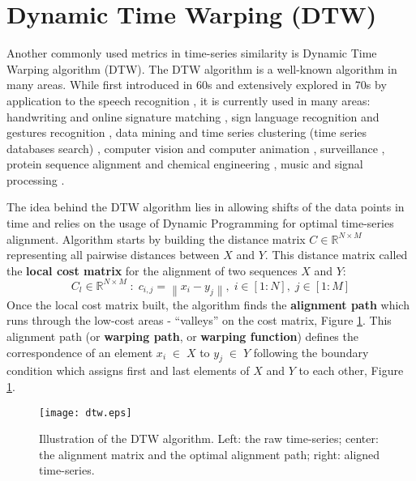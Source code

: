 \section{Dynamic Time Warping (DTW)}
Another commonly used metrics in time-series similarity is Dynamic Time Warping algorithm (DTW). The DTW algorithm is a well-known algorithm in many areas. While first introduced in 60s \cite{citeulike:3733907} and extensively explored in 70s by application to the speech recognition \cite{citeulike:603020}, \cite{citeulike:3496861} it is currently used in many areas: handwriting and online signature matching \cite{citeulike:2838910} \cite{citeulike:2584345}, sign language recognition \cite{citeulike:3789957} and gestures recognition \cite{citeulike:3789964} \cite{citeulike:3789957}, data mining and time series clustering (time series databases search) \cite{citeulike:3815076} \cite{citeulike:3733893} \cite{citeulike:3788783} \cite{citeulike:3731715} \cite{citeulike:3731713} \cite{citeulike:3789897}, computer vision and computer animation \cite{citeulike:3728229}, surveillance \cite{citeulike:964832}, protein sequence alignment and chemical engineering \cite{citeulike:3733894}, music and signal processing \cite{citeulike:3736775} \cite{citeulike:3728229} \cite{citeulike:3728228}.

The idea behind the DTW algorithm lies in allowing shifts of the data points in time and relies on the usage of Dynamic Programming \cite{citeulike:3733907} for optimal time-series alignment. Algorithm starts by building the distance matrix $C \in \mathbb{R}^{N \times M}$ representing all pairwise distances between $X$ and $Y$. This distance matrix called the \textbf{local cost matrix} for the alignment of two sequences $X$ and $Y$:
\begin{equation}
\label{eq:localcost}
C_{l} \in \mathbb{R}^{N \times M} \; : \; c_{i,j} = \left\| x_{i} - y_{j} \right\|, \; i \in [1:N], \; j \in [1:M]
\end{equation}
Once the local cost matrix built, the algorithm finds the \textbf{alignment path} which runs through the low-cost areas - ``valleys'' on the cost matrix, Figure \ref{fig:dtw}. This alignment path (or \textbf{warping path}, or \textbf{warping function}) defines the correspondence of an element $x_{i} \; \in \; X$ to $y_{j} \; \in \; Y$ following the boundary condition which assigns first and last elements of $X$ and $Y$ to each other, Figure \ref{fig:dtw}.

\begin{figure}[tbp]
   \centering
   \texttt{[image: dtw.eps]}
   \caption{Illustration of the DTW algorithm. Left: the raw time-series; center: the alignment matrix and the optimal alignment path; right: aligned time-series.}
   \label{fig:dtw}
\end{figure} 

